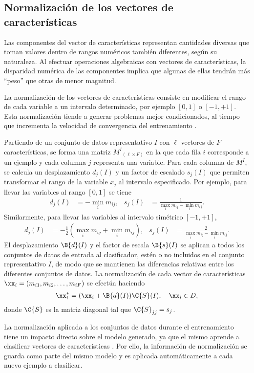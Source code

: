 %
%
%
\subsection{Normalización de los vectores de características}
%
Las componentes del vector de características representan cantidades
diversas que toman valores dentro de rangos numéricos también
diferentes, según su naturaleza.  Al efectuar operaciones algebraicas
con vectores de características, la disparidad numérica de las
componentes implica que algunas de ellas tendrán más ``peso'' que
otras de menor magnitud.

La normalización de los vectores de características consiste en
modificar el rango de cada variable a un intervalo determinado, por
ejemplo $[0,1]$ o $[-1,+1]$. Esta normalización tiende a generar
problemas mejor condicionados, al tiempo que incrementa la velocidad
de convergencia del entrenamiento \cite{nnfaq2}.

Partiendo de un conjunto de datos representativo $I$ con $\ell$
vectores de $F$ características, se forma una matriz
$M^I{}_{(\ell\times{}F)}$ en la que cada fila $i$ corresponde a un
ejemplo y cada columna $j$ representa una variable.  Para cada columna
de $M^I$, se calcula un desplazamiento $d_j(I)$ y un factor de
escalado $s_j(I)$ que permiten transformar el rango de la variable
$x_j$ al intervalo especificado. Por ejemplo, para llevar las
variables al rango $[0,1]$ se tiene
%
\begin{align}
  d_j(I) &= - \min_i m_{ij}, &
  s_j(I) &= \frac{1}{\max_i m_{ij} - \min_i m_{ij}}.
\end{align}
%
Similarmente, para llevar las variables al intervalo simétrico
$[-1,+1]$,
%
\begin{align}
  d_j(I) &= -\frac{1}{2}\left(\max_i m_{ij} + \min_i m_{ij}\right), &
  s_j(I) &= \frac{2}{\max_i m_{ij} - \min_i m_{ij}}.
\end{align}
%
El desplazamiento $\B{d}(I)$ y el factor de escala $\B{s}(I)$ se
aplican a todos los conjuntos de datos de entrada al clasificador,
estén o no incluidos en el conjunto representativo $I$, de modo que se
mantienen las diferencias relativas entre los diferentes conjuntos de
datos. La normalización de cada vector de características
$\xx_i=(m_{i1},m_{i2},\ldots,m_{iF})$ se efectúa haciendo
%
\begin{align}
  \xx_i^{*} = (\xx_i + \B{d}(I)) \C{S}(I),\quad \xx_i\in D,
\end{align}
%
donde $\C{S}$ es la matriz diagonal tal que $\C{S}_{jj}=s_j$.

La normalización aplicada a los conjuntos de datos durante el
entrenamiento tiene un impacto directo sobre el modelo generado, ya
que el mismo aprende a clasificar vectores de características
.  Por ello, la información de normalización se guarda
como parte del mismo modelo y es aplicada automáticamente a cada nuevo
ejemplo a clasificar.

